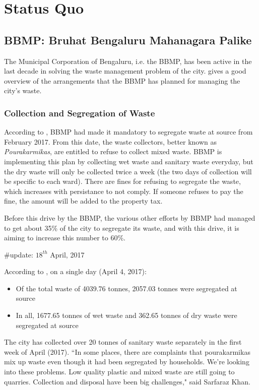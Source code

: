 \documentclass[10pt]{article}
\begin{document}

\section{Status Quo}



\subsection{BBMP: Bruhat Bengaluru Mahanagara Palike}

The Municipal Corporation of Bengaluru, i.e. the BBMP, has been active in the last decade in solving the waste management problem of the city. \cite{BBMP:SWMOverview} gives a good overview of the arrangements that the BBMP has planned for managing the city's waste.

\subsubsection{Collection and Segregation of Waste}

According to \citep{theHindu:segregation_at_source_31Jan2017}, BBMP had made it mandatory to segregate waste at source from February 2017. From this date, the waste collectors, better known as \textit{Pourakarmikas}, are entitled to refuse to collect mixed waste. BBMP is implementing this plan by collecting wet waste and sanitary waste everyday, but the dry waste will only be collected twice a week (the two days of collection will be specific to each ward).
There are fines for refusing to segregate the waste, which increases with persistance to not comply. If someone refuses to pay the fine, the amount will be added to the property tax.

Before this drive by the BBMP, the various other efforts by BBMP had managed to get about 35\% of the city to segregate its waste, and with this drive, it is aiming to increase this number to 60\%.

\#update: $18^{th}$ April, 2017

According to \cite{ToI:segregation_at_source}, on a single day (April 4, 2017):
\begin{itemize}
	\item Of the total waste of 4039.76 tonnes, 2057.03 tonnes were segregated at source
	\item In all, 1677.65 tonnes of wet waste and 362.65 tonnes of dry waste were segregated at source
\end{itemize}
The city has collected over 20 tonnes of sanitary waste separately in the first week of April (2017).
 ``In some places, there are complaints that pourakarmikas mix up waste even though it had been segregated by households. We're looking into these problems. Low quality plastic and mixed waste are still going to quarries. Collection and disposal have been big challenges," said Sarfaraz Khan.
\end{document}
